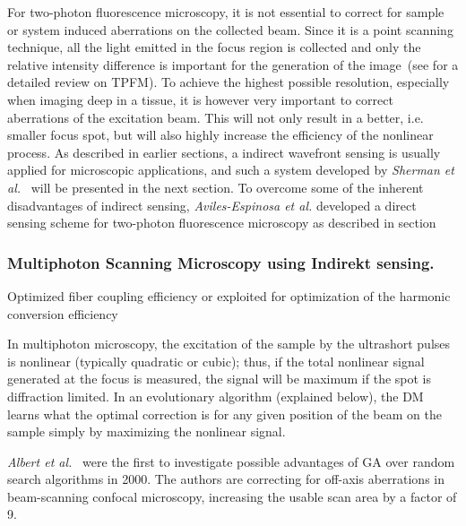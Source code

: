 For two-photon fluorescence microscopy, it is not essential to correct for sample or system induced aberrations on the collected beam. Since it is a point scanning technique, all the light emitted in the focus region is collected and only the relative intensity difference is important for the generation of the image~(see \cite{scan_TPFM_review} for a detailed review on TPFM). To achieve the highest possible resolution, especially when imaging deep in a tissue, it is however very important to correct aberrations of the excitation beam. This will not only result in a better, i.e. smaller focus spot, but will also highly increase the efficiency of the nonlinear process. As described in earlier sections, a indirect wavefront sensing is usually applied for microscopic applications, and such a system developed by \emph{Sherman et al.}~\cite{Genetic_MPFM} will be presented in the next section. To overcome some of the inherent disadvantages of indirect sensing, \emph{Aviles-Espinosa et al.} developed a direct sensing scheme for two-photon fluorescence microscopy as described in section~

\subsubsection{Multiphoton Scanning Microscopy using Indirekt sensing. }
\label{sec:MultiphotonScanningMicroscopyUsingIndirektSensing}

\cite{Genetic_MPFM,Genetic_smart_algorithm}

Optimized fiber coupling efficiency \cite{Genetic_fiber_coupling} or exploited for optimization of the harmonic conversion efficiency~\cite{Genetic_Harmonic_optimization}

In multiphoton microscopy, the excitation of the sample by the ultrashort pulses is nonlinear (typically quadratic or cubic); thus, if the total nonlinear signal generated at the focus is measured, the signal will be maximum if the spot is diffraction limited. In an evolutionary algorithm (explained below), the DM learns what the optimal correction is for any given position of the beam on the sample simply by maximizing the nonlinear signal. 

\emph{Albert et al.}~\cite{Genetic_smart_algorithm} were the first to investigate possible advantages of GA over random search algorithms in 2000. The authors are correcting for off-axis aberrations in beam-scanning confocal microscopy, increasing the usable scan area by a factor of 9. 





